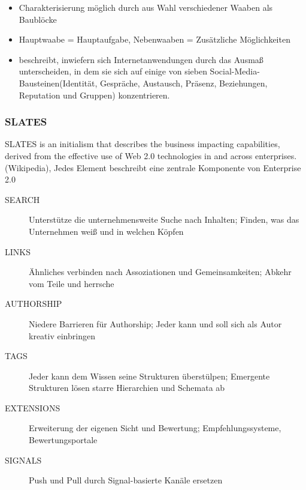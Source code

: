 \documentclass{article} %
\begin{document}
	\begin{itemize}
		\item Charakterisierung möglich durch aus Wahl verschiedener Waaben als Baublöcke
		\item Hauptwaabe = Hauptaufgabe, Nebenwaaben = Zusätzliche Möglichkeiten
		\item  beschreibt, inwiefern sich Internetanwendungen durch das Ausmaß unterscheiden, in dem sie sich auf einige von sieben Social-Media-Bausteinen(Identität, Gespräche, Austausch, Präsenz, Beziehungen, Reputation und Gruppen) konzentrieren.
	\end{itemize}
	\subsubsection{SLATES}
	\glqq SLATES is an initialism that describes the business impacting capabilities, derived from the effective use of Web 2.0 technologies in and across enterprises.\grqq (Wikipedia), Jedes Element beschreibt eine zentrale Komponente von Enterprise 2.0
	\begin{description}
		\item[SEARCH] Unterstütze die unternehmensweite Suche nach Inhalten;
		Finden, was das Unternehmen weiß und in welchen Köpfen
		\item[LINKS] Ähnliches verbinden nach Assoziationen und Gemeinsamkeiten;
		Abkehr vom  \glqq Teile und herrsche\glqq 
		\item[AUTHORSHIP] Niedere Barrieren für Authorship;
		Jeder kann und soll sich als Autor kreativ einbringen
		\item[TAGS] Jeder kann dem Wissen seine Strukturen überstülpen;
		Emergente Strukturen lösen starre Hierarchien und Schemata ab
		\item[EXTENSIONS] Erweiterung der eigenen Sicht und Bewertung;
		Empfehlungssysteme, Bewertungsportale
		\item[SIGNALS] Push und Pull durch Signal-basierte Kanäle ersetzen
	\end{description}
\end{document}
